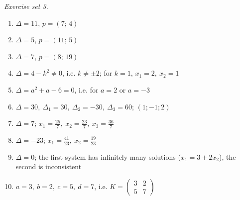 \par\noindent\emph{Exercise set 3.}\nopagebreak
\begin{enumerate}[label=\arabic*., leftmargin=*, itemsep=1pt]
\item $\Delta=11$, $p=(7;\,4)$
\item $\Delta=5$, $p=(11;\,5)$
\item $\Delta=7$, $p=(8;\,19)$
\item $\Delta=4-k^2\ne0$, i.e. $k\ne\pm2$; for $k=1$, $x_1=2,\ x_2=1$
\item $\Delta=a^2+a-6=0$, i.e. for $a=2$ or $a=-3$
\item $\Delta=30,\ \Delta_1=30,\ \Delta_2=-30,\ \Delta_3=60$; $(1;-1;2)$
\item $\Delta=7$; $x_1=\frac{25}{7},\ x_2=\frac{23}{7},\ x_3=\frac{36}{7}$
\item $\Delta=-23$; $x_1=\frac{41}{23},\ x_2=\frac{19}{23}$
\item $\Delta=0$; the first system has infinitely many solutions ($x_1=3+2x_2$), the second is inconsistent
\item $a=3,\ b=2,\ c=5,\ d=7$, i.e. $K=\left(\begin{smallmatrix}3&2\\5&7\end{smallmatrix}\right)$
\end{enumerate}
